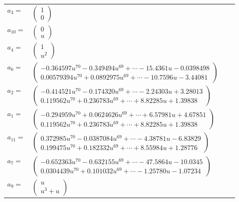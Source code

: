 \documentclass[1p]{elsarticle_modified}
\theoremstyle{definition}
\begin{document}
\begin{tabular}{m{7pt} m{180pt} m{7pt} m{180pt} }
\flushright $a_{3}=$&$\begin{pmatrix}1\\0\end{pmatrix}$ \\
\flushright $a_{10}=$&$\begin{pmatrix}0\\u\end{pmatrix}$ \\
\flushright $a_{4}=$&$\begin{pmatrix}1\\u^2\end{pmatrix}$ \\
\flushright $a_{6}=$&$\begin{pmatrix}-0.364597 u^{70}-0.349494 u^{69}+\cdots-15.4361 u-0.0398498\\0.00579394 u^{70}+0.0892975 u^{69}+\cdots-10.7596 u-3.44081\end{pmatrix}$ \\
\flushright $a_{2}=$&$\begin{pmatrix}-0.414521 u^{70}-0.174320 u^{69}+\cdots-2.24303 u+3.28013\\0.119562 u^{70}+0.236783 u^{69}+\cdots+8.82285 u+1.39838\end{pmatrix}$ \\
\flushright $a_{1}=$&$\begin{pmatrix}-0.294959 u^{70}+0.0624626 u^{69}+\cdots+6.57981 u+4.67851\\0.119562 u^{70}+0.236783 u^{69}+\cdots+8.82285 u+1.39838\end{pmatrix}$ \\
\flushright $a_{11}=$&$\begin{pmatrix}0.372985 u^{70}-0.0387084 u^{69}+\cdots-4.38781 u-6.83829\\0.199475 u^{70}+0.182332 u^{69}+\cdots+8.55984 u+1.28776\end{pmatrix}$ \\
\flushright $a_{7}=$&$\begin{pmatrix}-0.652363 u^{70}-0.632155 u^{69}+\cdots-47.5864 u-10.0345\\0.0304439 u^{70}+0.101032 u^{69}+\cdots-1.25780 u-1.07234\end{pmatrix}$ \\
\flushright $a_{9}=$&$\begin{pmatrix}u\\u^3+u\end{pmatrix}$ \\

\end{tabular}
\end{document}
